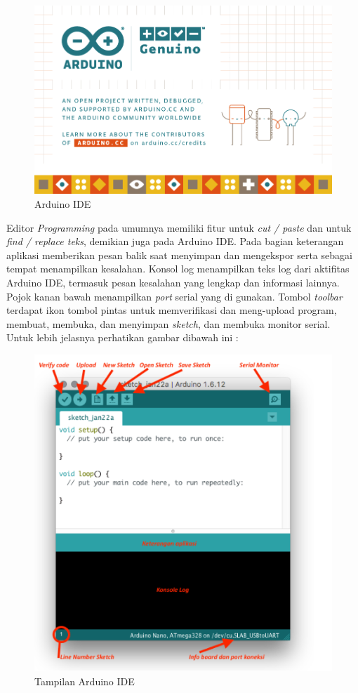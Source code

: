\begin{figure}[H]
\centering
\includegraphics[width=1\textwidth]{figures/ide.png}
\caption{Arduino IDE}
\label{print}
\end{figure}
Editor \textit{Programming} pada umumnya memiliki fitur untuk \textit{cut / paste} dan untuk \textit{find / replace teks}, demikian juga pada Arduino IDE. Pada bagian keterangan aplikasi memberikan pesan balik saat menyimpan dan mengekspor serta sebagai tempat menampilkan kesalahan. Konsol log menampilkan teks log dari aktifitas Arduino IDE, termasuk pesan kesalahan yang lengkap dan informasi lainnya. Pojok kanan bawah menampilkan \textit{port} serial yang di gunakan. Tombol \textit{toolbar} terdapat ikon tombol pintas untuk memverifikasi dan meng-upload program, membuat, membuka, dan menyimpan \textit{sketch}, dan membuka monitor serial. Untuk lebih jelasnya perhatikan gambar dibawah ini :

\begin{figure}[H]
\centering
\includegraphics[width=1\textwidth]{figures/arduino.png}
\caption{Tampilan Arduino IDE}
\label{print}
\end{figure}

